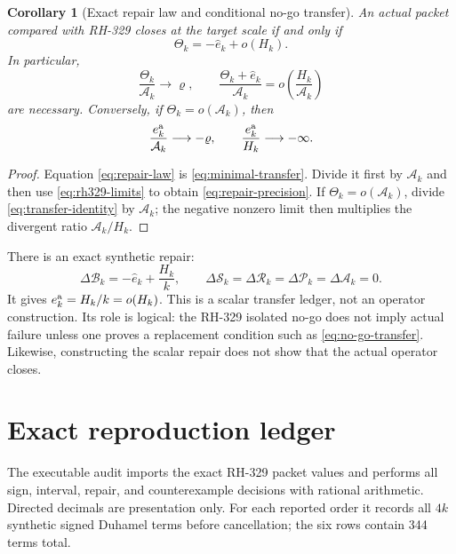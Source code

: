 \documentclass[11pt]{article}
\newtheorem{corollary}[theorem]{Corollary}
\theoremstyle{remark}
\newcommand{\cA}{\mathcal A}
\newcommand{\cB}{\mathcal B}
\newcommand{\cP}{\mathcal P}
\newcommand{\cR}{\mathcal R}
\newcommand{\cS}{\mathcal S}
\newcommand{\wh}[1]{\widehat{#1}}
\begin{document}
\begin{corollary}[Exact repair law and conditional no-go transfer]
\label{cor:rh329-transfer}
An actual packet compared with RH-329 closes at the target scale if and only
if
\begin{equation}
 \Theta_k=-\wh e_k+o(H_k).
 \label{eq:repair-law}
\end{equation}
In particular,
\begin{equation}
 \frac{\Theta_k}{\cA_k}\longrightarrow\varrho,
 \qquad
 \frac{\Theta_k+\wh e_k}{\cA_k}
 =o\!\left(\frac{H_k}{\cA_k}\right)
 \label{eq:repair-precision}
\end{equation}
are necessary.  Conversely, if $\Theta_k=o(\cA_k)$, then
\begin{equation}
 \frac{e_k^{\rm a}}{\cA_k}\longrightarrow-\varrho,
 \qquad
 \frac{e_k^{\rm a}}{H_k}\longrightarrow-\infty.
 \label{eq:no-go-transfer}
\end{equation}
\end{corollary}

\begin{proof}
Equation \eqref{eq:repair-law} is \eqref{eq:minimal-transfer}.
Divide it first by $\cA_k$ and then use \eqref{eq:rh329-limits} to obtain
\eqref{eq:repair-precision}.  If $\Theta_k=o(\cA_k)$, divide
\eqref{eq:transfer-identity} by $\cA_k$; the negative nonzero limit then
multiplies the divergent ratio $\cA_k/H_k$.
\end{proof}

There is an exact synthetic repair:
\begin{equation}
 \Delta\cB_k=-\wh e_k+\frac{H_k}{k},
 \qquad
 \Delta\cS_k=\Delta\cR_k=\Delta\cP_k=\Delta\cA_k=0.
 \label{eq:synthetic-repair}
\end{equation}
It gives $e_k^{\rm a}=H_k/k=o(H_k)$.  This is a scalar transfer ledger, not
an operator construction.  Its role is logical: the RH-329 isolated no-go
does not imply actual failure unless one proves a replacement condition such
as \eqref{eq:no-go-transfer}.  Likewise, constructing the scalar repair does
not show that the actual operator closes.

\section{Exact reproduction ledger}

The executable audit imports the exact RH-329 packet values and performs all
sign, interval, repair, and counterexample decisions with rational
arithmetic.  Directed decimals are presentation only.  For each reported
order it records all $4k$ synthetic signed Duhamel terms before cancellation;
the six rows contain 344 terms total.
\end{document}
